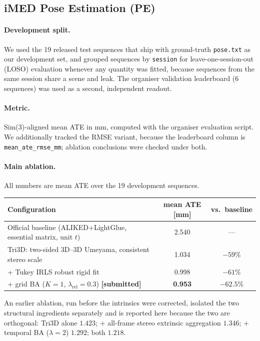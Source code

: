 \subsection{iMED Pose Estimation (PE)}

\paragraph{Development split.} We used the 19 released test sequences that ship with ground-truth
\texttt{pose.txt} as our development set, and grouped sequences by \texttt{session} for
leave-one-session-out (LOSO) evaluation whenever any quantity was fitted, because sequences from the same
session share a scene and leak. The organiser validation leaderboard (6 sequences) was used as a second,
independent readout.

\paragraph{Metric.} Sim(3)-aligned mean ATE in mm, computed with the organiser evaluation script. We
additionally tracked the RMSE variant, because the leaderboard column is
\texttt{mean\_ate\_rmse\_mm}; ablation conclusions were checked under both.

\paragraph{Main ablation.} All numbers are mean ATE over the 19 development sequences.

\begin{center}
\begin{tabular}{lcc}
\toprule
Configuration & mean ATE [mm] & vs.\ baseline \\
\midrule
Official baseline (ALIKED+LightGlue, essential matrix, unit $t$) & 2.540 & --- \\
Tri3D: two-sided 3D--3D Umeyama, consistent stereo scale        & 1.034 & $-59\%$ \\
\quad + Tukey IRLS robust rigid fit                              & 0.998 & $-61\%$ \\
\quad + grid BA ($K=1$, $\lambda_{\mathrm{rel}}=0.3$) \textbf{[submitted]} & \textbf{0.953} & $\mathbf{-62.5\%}$ \\
\bottomrule
\end{tabular}
\end{center}

An earlier ablation, run before the intrinsics were corrected, isolated the two structural ingredients
separately and is reported here because the two are orthogonal: Tri3D alone $1.423$; $+$ all-frame stereo
extrinsic aggregation $1.346$; $+$ temporal BA ($\lambda=2$) $1.292$; both $1.218$.

